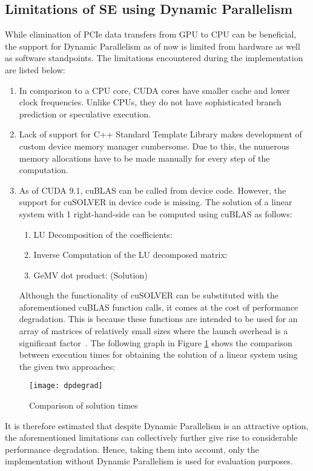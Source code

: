\documentclass[thesis.tex]{subfiles}
\begin{document}
\subsection{Limitations of SE using Dynamic Parallelism}
While elimination of PCIe data transfers from GPU to CPU can be beneficial, the support for Dynamic Parallelism as of now is limited from hardware as well as software standpoints. The limitations encountered during the implementation are listed below:
\begin{enumerate}
	\item In comparison to a CPU core, CUDA cores have smaller cache and lower clock frequencies. Unlike CPUs, they do not have sophisticated branch prediction or speculative execution.
	\item Lack of support for C++ Standard Template Library makes development of custom device memory manager cumbersome. Due to this, the numerous memory allocations have to be made manually for every step of the computation.
	\item As of CUDA 9.1, cuBLAS can be called from device code. However, the support for cuSOLVER in device code is missing. The solution of a linear system with 1 right-hand-side can be computed using cuBLAS as follows:
		\begin{enumerate}
			\item LU Decomposition of the coefficients:  
			\item Inverse Computation of the LU decomposed matrix:  
			\item GeMV dot product:  (Solution)
		\end{enumerate}
	Although the functionality of cuSOLVER can be substituted with the aforementioned cuBLAS function calls, it comes at the cost of performance degradation. This is because these functions are intended to be used for an array of matrices of relatively small sizes where the launch overhead is a significant factor~\cite{cuBLAS}. The following graph in Figure \ref{fig:dpdegrad} shows the comparison between execution times for obtaining the solution of a linear system using the given two approaches:
\end{enumerate}

\begin{figure}[H]
	\centering
	\texttt{[image: dpdegrad]}
	\caption{Comparison of solution times}
	\label{fig:dpdegrad}
\end{figure}
It is therefore estimated that despite Dynamic Parallelism is an attractive option, the aforementioned limitations can collectively further give rise to considerable performance degradation. Hence, taking them into account, only the implementation without Dynamic Parallelism is used for evaluation purposes.
\end{document}
